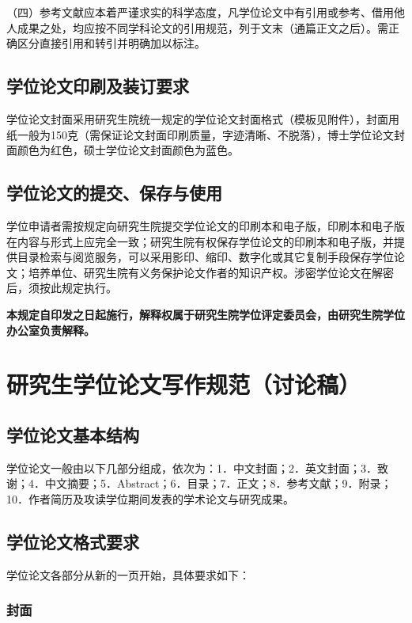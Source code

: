 \documentclass[a4paper,12pt,oneside,openany]{book}
\begin{document}
\begin{CJK}{UTF8}{hei}
（四）参考文献应本着严谨求实的科学态度，凡学位论文中有引用或参考、借用他人成果之处，均应按不同学科论文的引用规范，列于文末（通篇正文之后）。需正确区分直接引用和转引并明确加以标注。


\section{学位论文印刷及装订要求}

学位论文封面采用研究生院统一规定的学位论文封面格式（模板见附件），封面用纸一般为150克（需保证论文封面印刷质量，字迹清晰、不脱落），博士学位论文封面颜色为红色，硕士学位论文封面颜色为蓝色。


\section{学位论文的提交、保存与使用}

学位申请者需按规定向研究生院提交学位论文的印刷本和电子版，印刷本和电子版在内容与形式上应完全一致；研究生院有权保存学位论文的印刷本和电子版，并提供目录检索与阅览服务，可以采用影印、缩印、数字化或其它复制手段保存学位论文；培养单位、研究生院有义务保护论文作者的知识产权。涉密学位论文在解密后，须按此规定执行。

\textbf{本规定自印发之日起施行，解释权属于研究生院学位评定委员会，由研究生院学位办公室负责解释。} 


\chapter{研究生学位论文写作规范（讨论稿）}


\section{学位论文基本结构}

学位论文一般由以下几部分组成，依次为：1．中文封面；2．英文封面；3．致谢；4．中文摘要；5．Abstract；6．目录；7．正文；8．参考文献；9．附录；10．作者简历及攻读学位期间发表的学术论文与研究成果。 


\section{学位论文格式要求}

学位论文各部分从新的一页开始，具体要求如下：


\subsection{封面}



\end{CJK}
\end{document}
